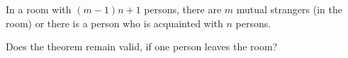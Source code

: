 In a room with $(m - 1)n + 1$ persons, there are $m$ mutual strangers (in the room) or there is a person who is acquainted with $n$ persons.

Does the theorem remain valid, if one person leaves the room?
